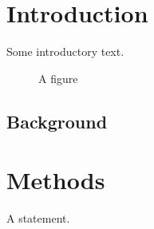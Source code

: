 \documentclass{article}
\begin{document}
\section{Introduction}
Some introductory text.

\begin{figure}
  \caption{A figure}
\end{figure}

\subsection{Background}

\section{Methods}

\begin{theorem}
A statement.
\end{theorem}
\end{document}
